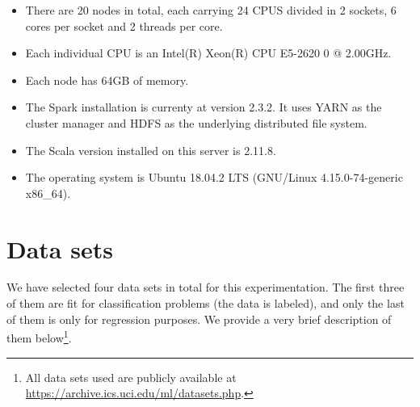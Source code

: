 \begin{itemize}
  \item There are 20 nodes in total, each carrying 24 CPUS divided in 2 sockets, 6 cores per socket and 2 threads per core.
  \item Each individual CPU is an Intel(R) Xeon(R) CPU E5-2620 0 @ 2.00GHz.
  \item Each node has 64GB of memory.
  \item The Spark installation is currenty at version 2.3.2. It uses YARN as the cluster manager and HDFS as the underlying distributed file system.
  \item The Scala version installed on this server is 2.11.8.
  \item The operating system is Ubuntu 18.04.2 LTS (GNU/Linux 4.15.0-74-generic x86\_64).
\end{itemize}

\section{Data sets}

We have selected four data sets in total for this experimentation. The first three of them are fit for classification problems (the data is labeled), and only the last of them is only for regression purposes. We provide a very brief description of them below\footnote{All data sets used are publicly available at \url{https://archive.ics.uci.edu/ml/datasets.php}.}.

